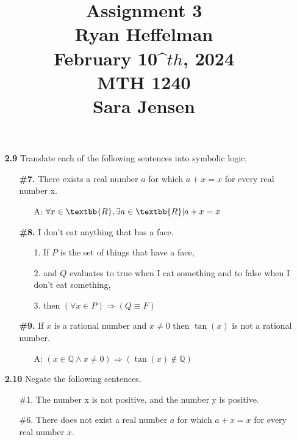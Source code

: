 \documentclass[16pt]{article}
\begin{document}
\large
\date{}
\title{\Large Assignment 3 \\ Ryan Heffelman \\ February 10^\(th\), 2024 \\ MTH 1240 \\ Sara Jensen}
\maketitle
\begin{enumerate}
    \item[\textbf{2.9  }]  Translate each of the following sentences into symbolic logic.
    \begin{enumerate}
        \item[\textbf{\#7.}] There exists a real number $a$ for which $a + x = x$ for every real number x.
        \begin{enumerate}
            \item[A: ] $\forall x \in \textbb{R}, \exists a \in \textbb{R} \vert a + x = x$
        \end{enumerate}
        \item[\textbf{\#8.}] I don't eat anything that has a face.
        \begin{enumerate}
            \item[1.] If $P$ is the set of things that have a face,
            \item[2.] and $Q$ evaluates to true when I eat something and to false when I don't eat something,
            \item[3.] then $(\forall x \in P) \Rightarrow (Q \equiv F)$
        \end{enumerate}
        \item[\textbf{\#9.}] If $x$ is a rational number and $x \neq 0$ then $\tan(x)$ is not a rational number.
        \begin{enumerate}
            \item[A: ] $(x \in \mathbb{Q} \land x \neq 0) \Rightarrow (\tan(x) \notin \mathbb{Q})$
        \end{enumerate}
    \end{enumerate}
    \item[\textbf{2.10  }] Negate the following sentences.
    \begin{enumerate}
        \item[\#1.] The number x is not positive, and the number y is positive.
        \item[\#6.] There does not exist a real number $a$ for which $a + x = x$ for every real number $x$.

\end{enumerate}
\end{enumerate}
\end{document}
